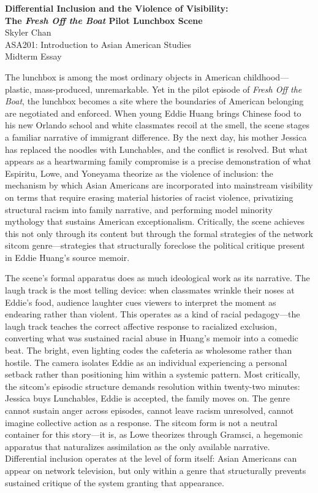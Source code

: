 \documentclass[12pt]{article}
\begin{document}
\begin{center}
{\large \textbf{Differential Inclusion and the Violence of Visibility:}\\
\textbf{The \textit{Fresh Off the Boat} Pilot Lunchbox Scene}}\\[12pt]
Skyler Chan\\
ASA201: Introduction to Asian American Studies\\
Midterm Essay
\end{center}

\vspace{12pt}

The lunchbox is among the most ordinary objects in American childhood---plastic, mass-produced, unremarkable. Yet in the pilot episode of \textit{Fresh Off the Boat}, the lunchbox becomes a site where the boundaries of American belonging are negotiated and enforced. When young Eddie Huang brings Chinese food to his new Orlando school and white classmates recoil at the smell, the scene stages a familiar narrative of immigrant difference. By the next day, his mother Jessica has replaced the noodles with Lunchables, and the conflict is resolved. But what appears as a heartwarming family compromise is a precise demonstration of what Espiritu, Lowe, and Yoneyama theorize as the violence of inclusion: the mechanism by which Asian Americans are incorporated into mainstream visibility on terms that require erasing material histories of racist violence, privatizing structural racism into family narrative, and performing model minority mythology that sustains American exceptionalism. Critically, the scene achieves this not only through its content but through the formal strategies of the network sitcom genre---strategies that structurally foreclose the political critique present in Eddie Huang's source memoir.

The scene's formal apparatus does as much ideological work as its narrative. The laugh track is the most telling device: when classmates wrinkle their noses at Eddie's food, audience laughter cues viewers to interpret the moment as endearing rather than violent. This operates as a kind of racial pedagogy---the laugh track teaches the correct affective response to racialized exclusion, converting what was sustained racial abuse in Huang's memoir into a comedic beat. The bright, even lighting codes the cafeteria as wholesome rather than hostile. The camera isolates Eddie as an individual experiencing a personal setback rather than positioning him within a systemic pattern. Most critically, the sitcom's episodic structure demands resolution within twenty-two minutes: Jessica buys Lunchables, Eddie is accepted, the family moves on. The genre cannot sustain anger across episodes, cannot leave racism unresolved, cannot imagine collective action as a response. The sitcom form is not a neutral container for this story---it is, as Lowe theorizes through Gramsci, a hegemonic apparatus that naturalizes assimilation as the only available narrative. Differential inclusion operates at the level of form itself: Asian Americans can appear on network television, but only within a genre that structurally prevents sustained critique of the system granting that appearance.
\end{document}
